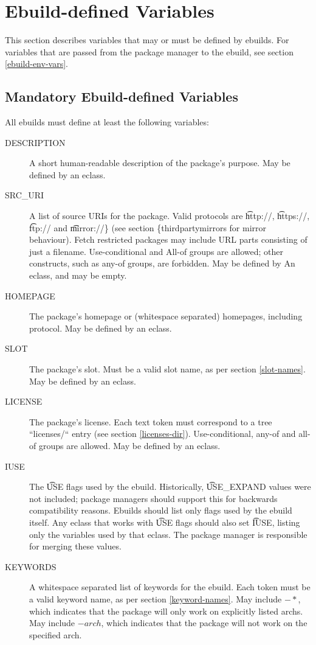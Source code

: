 \chapter{Ebuild-defined Variables}

\note This section describes variables that may or must be defined by ebuilds. For
variables that are passed from the package manager to the ebuild, see section \ref{ebuild-env-vars}.

\section{Mandatory Ebuild-defined Variables}

All ebuilds must define at least the following variables:

\begin{description}
\item[DESCRIPTION] A short human-readable description of the package's purpose. May be defined by an
    eclass.
\item[SRC\_URI] A list of source URIs for the package. Valid protocols are \t{http://},
    \t{https://}, \t{ftp://} and \t{mirror://\} (see section \{thirdpartymirrors} for mirror behaviour).
    Fetch restricted packages may include URL parts consisting of just a filename.  Use-conditional and
    All-of groups are allowed; other constructs, such as any-of groups, are forbidden. May be defined by
    An eclass, and may be empty.
\item[HOMEPAGE] The package's homepage or (whitespace separated) homepages, including protocol. May
    be defined by an eclass.
\item[SLOT] The package's slot. Must be a valid slot name, as per section \ref{slot-names}. May
    be defined by an eclass.
\item[LICENSE] The package's license. Each text token must correspond to a tree ``licenses/`` entry
    (see section \ref{licenses-dir}). Use-conditional, any-of and all-of groups are allowed.
    May be defined by an eclass.
\item[IUSE] The \t{USE} flags used by the ebuild. Historically, \t{USE\_EXPAND} values were not
    included; package managers should support this for backwards compatibility reasons. Ebuilds
    should list only flags used by the ebuild itself. Any eclass that works with \t{USE} flags
    should also set \t{IUSE}, listing only the variables used by that eclass. The package manager is
    responsible for merging these values.
\item[KEYWORDS] A whitespace separated list of keywords for the ebuild. Each token must be a
    valid keyword name, as per section \ref{keyword-names}. May include $-*$, which
    indicates that the package will only work on explicitly listed archs. May include $-arch$,
    which indicates that the package will not work on the specified arch.
\end{description}

